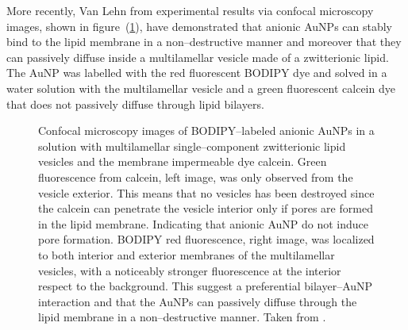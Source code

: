 More recently, Van Lehn \etal{} \cite{VanLehn2013} from experimental results via confocal microscopy images, shown in figure~(\ref{fig:fluorescent}), have demonstrated that anionic \acp{AuNP} can stably bind to the lipid membrane in a non--destructive manner and moreover that they can passively diffuse inside a multilamellar vesicle made of a zwitterionic lipid. The \ac{AuNP} was labelled with the red fluorescent BODIPY dye and solved in a water solution with the multilamellar vesicle and a green fluorescent calcein dye that does not passively diffuse through lipid bilayers.
\begin{figure}[!ht]
	\centering
	\qquad\qquad\qquad%
	\caption{Confocal microscopy images of BODIPY--labeled anionic \acp{AuNP} in a solution with multilamellar single--component zwitterionic lipid vesicles and the membrane impermeable dye calcein. Green fluorescence from calcein, left image, was only observed from the vesicle exterior. This means that no vesicles has been destroyed since the calcein can penetrate the vesicle interior only if pores are formed in the lipid membrane. Indicating that anionic \acs{AuNP} do not induce pore formation. BODIPY red fluorescence, right image, was localized to both interior and exterior membranes of the multilamellar vesicles, with a noticeably stronger fluorescence at the interior respect to the background. This suggest a preferential bilayer--\acs{AuNP} interaction and that the \acp{AuNP} can passively diffuse through the lipid membrane in a non--destructive manner. Taken from \cite{VanLehn2013}.}%
	\label{fig:fluorescent}
\end{figure}

